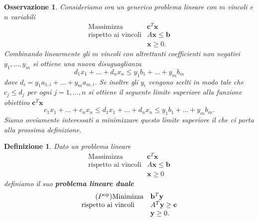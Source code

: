 \documentclass[italian, letter paper, 12pt, reqno]{article}
\theoremstyle{myteo}
\newtheorem{definition}[theorem]{Definizione}
\newtheorem{remark}[theorem]{Osservazione}
\numberwithin{equation}{section}
\newcommand{\dual}[1]{#1^{\text{op}}}
\begin{document}
\begin{remark}
  \label{oss:bound}
  Consideriamo ora un generico problema lineare con \(m\) vincoli e \(n\) variabili
  \begin{equation*}
    \begin{array}{ll}
      \text{Massimizza} & \mathbf{c}^T\mathbf{x}\\
      \text{rispetto ai vincoli} & A\mathbf{x}\leq\mathbf{b}\\
                        & \mathbf{x}\geq0.
    \end{array}
  \end{equation*}
  Combinando linearmente gli \(m\) vincoli con altrettanti coefficienti \emph{non negativi} \(y_1,\ldots,y_m\) si ottiene una nuova disuguaglianza
  \[d_1x_1+\ldots+d_nx_n\leq y_1b_1+\ldots+y_mb_m\]
  dove \(d_i = y_1a_{1,i}+\ldots+y_ma_{m,i}\). Se inoltre gli \(y_i\) vengono scelti in modo tale che \(c_j\leq d_j\) per ogni \(j=1,\ldots, n\) si ottiene il seguente limite superiore alla funzione obiettivo \(\mathbf{c}^T\mathbf{x}\)
  \[c_1x_1+\ldots+c_nx_n\leq d_1x_1+\ldots+d_nx_n\leq y_1b_1+\ldots+y_mb_m.\]
  Siamo ovviamente interessati a \emph{minimizzare} questo limite superiore il che ci porta alla prossima definizione.
\end{remark}

\begin{definition}
  \label{def:problema_duale}
  Dato un problema lineare
  \begin{equation*}
    \begin{array}{ll}
      \tag{\(P\)}
      \text{Massimizza} & \mathbf{c}^T\mathbf{x}\\
      \text{rispetto ai vincoli} & A\mathbf{x}\leq\mathbf{b}\\
                        & \mathbf{x}\geq0
    \end{array}
  \end{equation*}
  definiamo il suo \textbf{problema lineare duale}
  \begin{equation*}
    \begin{array}{ll}
      \tag{\(\dual{P}\)}
      \text{Minimizza} & \mathbf{b}^T\mathbf{y}\\
      \text{rispetto ai vincoli} & A^T\mathbf{y}\geq\mathbf{c}\\
                        & \mathbf{y}\geq0.
    \end{array}
  \end{equation*}
\end{definition}
\end{document}
